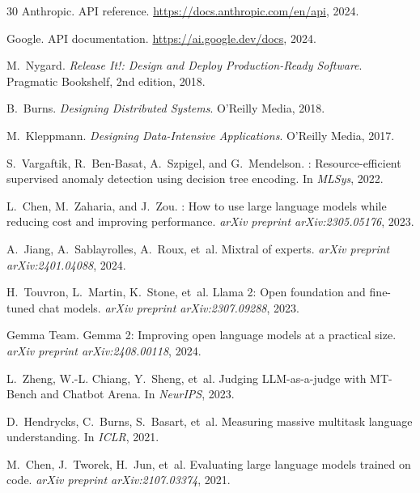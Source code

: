 \begin{thebibliography}{30}
Anthropic.
 {API} reference.
\newblock \url{https://docs.anthropic.com/en/api}, 2024.

Google.
 {API} documentation.
\newblock \url{https://ai.google.dev/docs}, 2024.

M.~Nygard.
\newblock \emph{Release It!: Design and Deploy Production-Ready Software}.
\newblock Pragmatic Bookshelf, 2nd edition, 2018.

B.~Burns.
\newblock \emph{Designing Distributed Systems}.
\newblock O'Reilly Media, 2018.

M.~Kleppmann.
\newblock \emph{Designing Data-Intensive Applications}.
\newblock O'Reilly Media, 2017.

S.~Vargaftik, R.~Ben-Basat, A.~Szpigel, and G.~Mendelson.
: Resource-efficient supervised anomaly detection using decision tree encoding.
\newblock In \emph{MLSys}, 2022.

L.~Chen, M.~Zaharia, and J.~Zou.
: How to use large language models while reducing cost and improving performance.
\newblock \emph{arXiv preprint arXiv:2305.05176}, 2023.

A.~Jiang, A.~Sablayrolles, A.~Roux, et~al.
\newblock Mixtral of experts.
\newblock \emph{arXiv preprint arXiv:2401.04088}, 2024.

H.~Touvron, L.~Martin, K.~Stone, et~al.
\newblock Llama 2: Open foundation and fine-tuned chat models.
\newblock \emph{arXiv preprint arXiv:2307.09288}, 2023.

Gemma Team.
\newblock Gemma 2: Improving open language models at a practical size.
\newblock \emph{arXiv preprint arXiv:2408.00118}, 2024.

L.~Zheng, W.-L. Chiang, Y.~Sheng, et~al.
\newblock Judging {LLM}-as-a-judge with {MT-Bench} and {Chatbot Arena}.
\newblock In \emph{NeurIPS}, 2023.

D.~Hendrycks, C.~Burns, S.~Basart, et~al.
\newblock Measuring massive multitask language understanding.
\newblock In \emph{ICLR}, 2021.

M.~Chen, J.~Tworek, H.~Jun, et~al.
\newblock Evaluating large language models trained on code.
\newblock \emph{arXiv preprint arXiv:2107.03374}, 2021.

\end{thebibliography}

